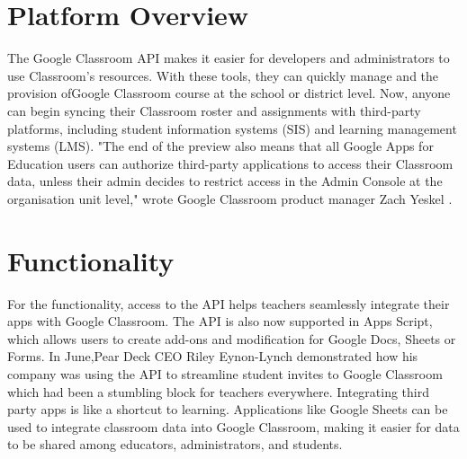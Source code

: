 \documentclass[11pt,]{article}
\begin{document}
\section{Platform Overview}
The Google Classroom API\cite{s4} makes it easier for developers and administrators to use Classroom's resources. With these tools, they can quickly manage and the provision  ofGoogle Classroom course at the school or district level.
Now, anyone can begin syncing their Classroom roster and assignments with third-party platforms, including student information systems (SIS) and learning management systems (LMS).
"The end of the preview also means that all Google Apps for Education users can authorize third-party applications to access their Classroom data, unless their admin decides to restrict access in the Admin Console at the organisation unit level," wrote Google Classroom product manager Zach Yeskel \cite{s5}.
\section{Functionality}
For the functionality, access to the API helps teachers seamlessly integrate their apps with Google Classroom. The API is also now supported in Apps Script\cite{s6}, which allows users to create add-ons and modification for Google Docs, Sheets or Forms.
In June,Pear Deck CEO Riley Eynon-Lynch demonstrated how his company was using the API to streamline student invites to Google Classroom  which had been a stumbling block for teachers everywhere\cite{s5}.
Integrating third party apps is like a shortcut to learning. Applications like Google Sheets can be used to integrate classroom data into Google Classroom, making it easier for data to be shared among educators, administrators, and students.






\end{document}
